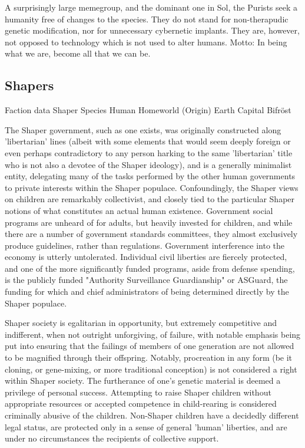 A surprisingly large memegroup, and the dominant one in Sol, the
Purists seek a humanity free of changes to the species. They do not
stand for non-therapudic genetic modification, nor for unnecessary
cybernetic implants. They are, however, not opposed to technology
which is not used to alter humans. Motto: In being what we are, become
all that we can be.






\subsection{Shapers}

Faction data 
Shaper 
Species 	Human 
Homeworld (Origin) 	Earth 
Capital 	Bifröst 

The Shaper government, such as one exists, was originally constructed
along 'libertarian' lines (albeit with some elements that would seem
deeply foreign or even perhaps contradictory to any person harking to
the same 'libertarian' title who is not also a devotee of the Shaper
ideology), and is a generally minimalist entity, delegating many of
the tasks performed by the other human governments to private
interests within the Shaper populace. Confoundingly, the Shaper views
on children are remarkably collectivist, and closely tied to the
particular Shaper notions of what constitutes an actual human
existence. Government social programs are unheard of for adults, but
heavily invested for children, and while there are a number of
government standards committees, they almost exclusively produce
guidelines, rather than regulations. Government interference into the
economy is utterly untolerated. Individual civil liberties are
fiercely protected, and one of the more significantly funded programs,
aside from defense spending, is the publicly funded "Authority
Surveillance Guardianship" or ASGuard, the funding for which and chief
administrators of being determined directly by the Shaper populace.

Shaper society is egalitarian in opportunity, but extremely
competitive and indifferent, when not outright unforgiving, of
failure, with notable emphasis being put into ensuring that the
failings of members of one generation are not allowed to be magnified
through their offspring. Notably, procreation in any form (be it
cloning, or gene-mixing, or more traditional conception) is not
considered a right within Shaper society. The furtherance of one's
genetic material is deemed a privilege of personal success. Attempting
to raise Shaper children without appropriate resources or accepted
competence in child-rearing is considered criminally abusive of the
children. Non-Shaper children have a decidedly different legal status,
are protected only in a sense of general 'human' liberties, and are
under no circumstances the recipients of collective support.

